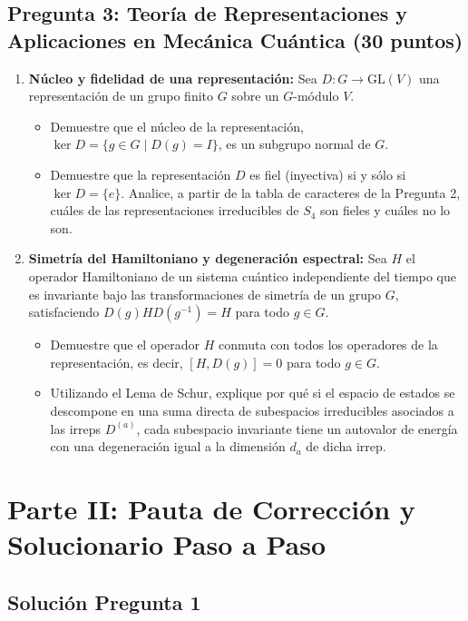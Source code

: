 \documentclass[11pt, a4paper]{article}
\begin{document}
\subsection*{Pregunta 3: Teoría de Representaciones y Aplicaciones en Mecánica Cuántica (30 puntos)}
\begin{enumerate}
    \item \textbf{Núcleo y fidelidad de una representación:} Sea $D : G \to \text{GL}(V)$ una representación de un grupo finito $G$ sobre un $G$-módulo $V$.
    \begin{itemize}
        \item Demuestre que el núcleo de la representación, $\ker D = \{g \in G \mid D(g) = I\}$, es un subgrupo normal de $G$.
        \item Demuestre que la representación $D$ es fiel (inyectiva) si y sólo si $\ker D = \{e\}$. Analice, a partir de la tabla de caracteres de la Pregunta 2, cuáles de las representaciones irreducibles de $S_4$ son fieles y cuáles no lo son.
    \end{itemize}
    \item \textbf{Simetría del Hamiltoniano y degeneración espectral:} Sea $H$ el operador Hamiltoniano de un sistema cuántico independiente del tiempo que es invariante bajo las transformaciones de simetría de un grupo $G$, satisfaciendo $D(g) H D(g^{-1}) = H$ para todo $g \in G$.
    \begin{itemize}
        \item Demuestre que el operador $H$ conmuta con todos los operadores de la representación, es decir, $[H, D(g)] = 0$ para todo $g \in G$.
        \item Utilizando el Lema de Schur, explique por qué si el espacio de estados se descompone en una suma directa de subespacios irreducibles asociados a las irreps $D^{(a)}$, cada subespacio invariante tiene un autovalor de energía con una degeneración igual a la dimensión $d_a$ de dicha irrep.
    \end{itemize}
\end{enumerate}

\newpage

\section*{Parte II: Pauta de Corrección y Solucionario Paso a Paso}

\subsection*{Solución Pregunta 1}
\end{document}
